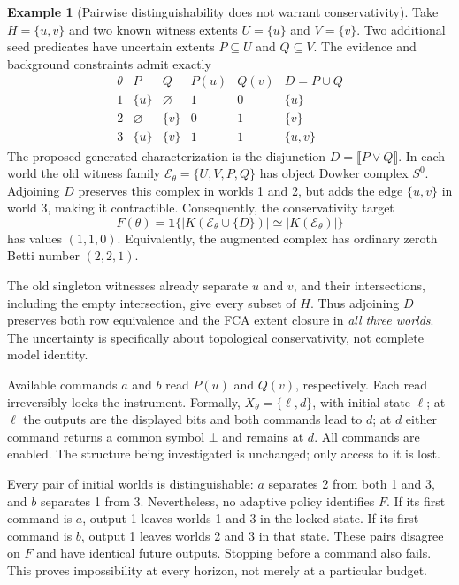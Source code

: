 \documentclass[11pt]{article}
\theoremstyle{definition}
\newtheorem{example}[theorem]{Example}
\begin{document}
\begin{example}[Pairwise distinguishability does not warrant conservativity]
\label{seq:destructive}
Take $H=\{u,v\}$ and two known witness extents $U=\{u\}$ and $V=\{v\}$.
Two additional seed predicates have uncertain extents $P\subseteq U$ and
$Q\subseteq V$. The evidence and background constraints admit exactly
\[
\begin{array}{c|cc|cc|c}
\theta&P&Q&P(u)&Q(v)&D=P\cup Q\\ \hline
1&\{u\}&\varnothing&1&0&\{u\}\\
2&\varnothing&\{v\}&0&1&\{v\}\\
3&\{u\}&\{v\}&1&1&\{u,v\}
\end{array}
\]
The proposed generated characterization is the disjunction
$D=\llbracket P\lor Q\rrbracket$. In each world the old witness family
$\mathcal E_\theta=\{U,V,P,Q\}$ has object Dowker complex $S^0$.
Adjoining $D$ preserves this complex in worlds 1 and 2, but adds the edge
$\{u,v\}$ in world 3, making it contractible. Consequently, the
conservativity target
\[
 F(\theta)=
 \mathbf1\{|K(\mathcal E_\theta\cup\{D\})|
                  \simeq |K(\mathcal E_\theta)|\}
\]
has values $(1,1,0)$. Equivalently, the augmented complex has ordinary
zeroth Betti number $(2,2,1)$.

The old singleton witnesses already separate $u$ and $v$, and their
intersections, including the empty intersection, give every subset of
$H$. Thus adjoining $D$ preserves both row equivalence and the FCA extent
closure in \emph{all three worlds}. The uncertainty is specifically about
topological conservativity, not complete model identity.

Available commands $a$ and $b$ read $P(u)$ and $Q(v)$, respectively. Each
read irreversibly locks the instrument. Formally,
$X_\theta=\{\ell,d\}$, with initial state $\ell$; at $\ell$ the outputs
are the displayed bits and both commands lead to $d$; at $d$ either command
returns a common symbol $\bot$ and remains at $d$. All commands are enabled.
The structure being investigated is unchanged; only access to it is lost.

Every pair of initial worlds is distinguishable: $a$ separates 2 from both
1 and 3, and $b$ separates 1 from 3. Nevertheless, no adaptive policy
identifies $F$. If its first command is $a$, output 1 leaves worlds 1 and 3
in the locked state. If its first command is $b$, output 1 leaves worlds
2 and 3 in that state. These pairs disagree on $F$ and have identical
future outputs. Stopping before a command also fails. This proves
impossibility at every horizon, not merely at a particular budget.
\end{example}
\end{document}
